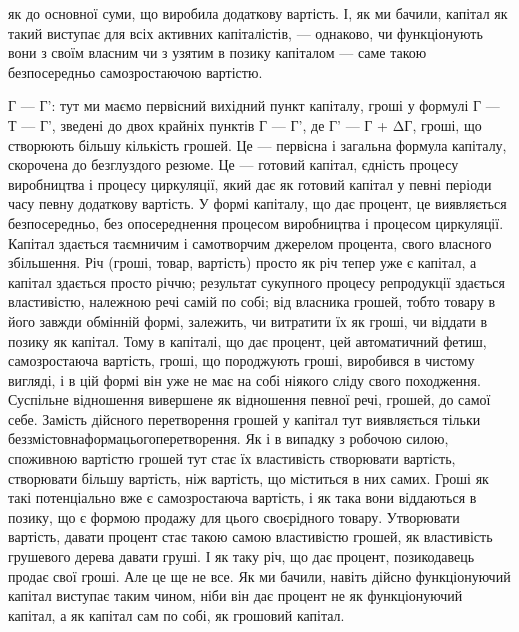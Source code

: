 \parcont{}  %
як до основної суми, що виробила додаткову вартість. І, як ми
бачили, капітал як такий виступає для всіх активних капіталістів,
— однаково, чи функціонують вони з своїм власним чи
з узятим в позику капіталом — саме такою безпосередньо самозростаючою
вартістю.

Г — Г': тут ми маємо первісний вихідний пункт капіталу, гроші
у формулі Г — Т — Г', зведені до двох крайніх пунктів Г — Г', де
Г' — Г + ΔГ, гроші, що створюють більшу кількість грошей.
Це — первісна і загальна формула капіталу, скорочена до безглуздого
резюме. Це — готовий капітал, єдність процесу виробництва
і процесу циркуляції, який дає як готовий капітал у
певні періоди часу певну додаткову вартість. У формі капіталу,
що дає процент, це виявляється безпосередньо, без опосереднення
процесом виробництва і процесом циркуляції. Капітал
здається таємничим і самотворчим джерелом процента, свого
власного збільшення. Річ (гроші, товар, вартість) просто як річ
тепер уже є капітал, а капітал здається просто річчю; результат
сукупного процесу репродукції здається властивістю, належною
речі самій по собі; від власника грошей, тобто товару
в його завжди обмінній формі, залежить, чи витратити їх як гроші,
чи віддати в позику як капітал. Тому в капіталі, що дає процент,
цей автоматичний фетиш, самозростаюча вартість, гроші,
що породжують гроші, виробився в чистому вигляді, і в цій
формі він уже не має на собі ніякого сліду свого походження.
Суспільне відношення вивершене як відношення певної речі, грошей,
до самої себе. Замість дійсного перетворення грошей у капітал
тут виявляється тільки беззмістовнаформацьогоперетворення.
Як і в випадку з робочою силою, споживною вартістю грошей
тут стає їх властивість створювати вартість, створювати більшу
вартість, ніж вартість, що міститься в них самих. Гроші як такі
потенціально вже є самозростаюча вартість, і як така вони віддаються
в позику, що є формою продажу для цього своєрідного
товару. Утворювати вартість, давати процент стає такою
самою властивістю грошей, як властивість грушевого дерева
давати груші. І як таку річ, що дає процент, позикодавець
продає свої гроші. Але це ще не все. Як ми бачили, навіть
дійсно функціонуючий капітал виступає таким чином, ніби він
дає процент не як функціонуючий капітал, а як капітал сам по
собі, як грошовий капітал.

